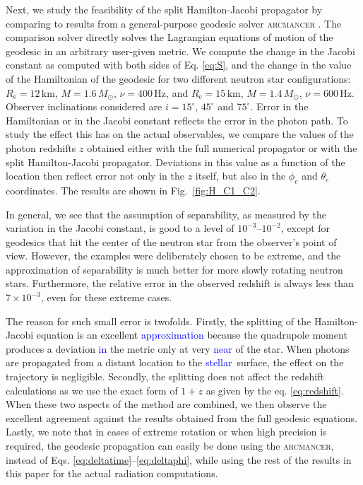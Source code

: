 \documentclass{aa}
\newcommand{\refe}[1]{\textcolor{blue}{{#1}}}
\newcommand{\refedel}[1]{}
\newcommand{\Msun}{\ensuremath{M_{\odot}}}
\begin{document}
Next, we study the feasibility of the split Hamilton-Jacobi propagator by comparing to results from a general-purpose geodesic solver \textsc{arcmancer} \citep{PRJ16}.
The comparison solver directly solves the Lagrangian equations of motion of the geodesic in an arbitrary user-given metric. 
We compute the change in the Jacobi constant as computed with both sides of Eq. \eqref{eq:S}, and the change in the value of the Hamiltonian of the geodesic for two different neutron star configurations:
$R_{\mathrm{e}}=12\,\mathrm{km}$, $M=1.6\,\Msun$, $\nu=400\,\mathrm{Hz}$, and $R_{\mathrm{e}}=15\,\mathrm{km}$, $M=1.4\,\Msun$, $\nu=600\,\mathrm{Hz}$.
Observer inclinations considered are $i=15^\circ$, $45^\circ$ and $75^\circ$.
Error in the Hamiltonian or in the Jacobi constant reflects the error in the photon path.
To study the effect this has on the actual observables, we compare the values of the photon redshifts $z$ obtained either with the full numerical propagator or with the split Hamilton-Jacobi propagator.
Deviations in this value as a function of the location then reflect error not only in the $z$ itself, but also in the $\phi_e$ and $\theta_e$ coordinates.
The results are shown in Fig.~\ref{fig:H_C1_C2}. 

In general, we see that the assumption of separability, as measured by the variation in the Jacobi constant, is good to a level of $10^{-3}$--$10^{-2}$, except for geodesics that hit the center of the neutron star from the observer's point of view. 
However, the examples were deliberately chosen to be extreme, and the approximation of separability is much better for more slowly rotating neutron stars.
Furthermore, the relative error in the observed redshift is always less than $7 \times 10^{-3}$, even for these extreme cases.

The reason for such small error is twofolds.
Firstly, the splitting of the Hamilton-Jacobi equation is an excellent \refe{approximation} because the quadrupole moment produces a deviation \refe{in} the metric only at very \refe{near} of the star.
When photons are propagated from a distant location to the \refe{stellar} surface, the effect on the\refedel{ exact} trajectory is negligible.
Secondly, the splitting does not affect the redshift calculations as we use the exact form of $1+z$ as given by the eq. \eqref{eq:redshift}.
When these two aspects of the method are combined, we then observe the excellent agreement against the results obtained from the full geodesic equations.
Lastly, we note that in cases of extreme rotation or when high precision is required, the geodesic propagation can easily be done using the \textsc{arcmancer}, instead of Eqs. \eqref{eq:deltatime}--\eqref{eq:deltaphi}, while using the rest of the results in this paper for the actual radiation computations.
\end{document}
